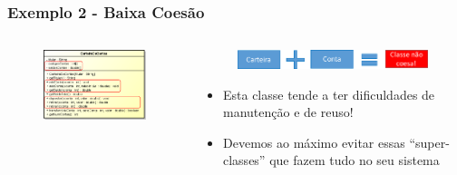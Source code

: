 \documentclass[aspectratio=169]{beamer}
\begin{document}
\begin{frame}\frametitle{Exemplo 2 - Baixa Coesão}
\begin{columns}
\begin{column}{0.5\linewidth}
\begin{figure}[h]
	\centering
	\includegraphics[height=0.45\paperheight]{imagens/carteira.png}
\end{figure}
\end{column}
\begin{column}{0.5\linewidth}
\begin{figure}[h]
	\centering
	\includegraphics[height=0.075\paperheight]{imagens/classe_nao_coesa.png}
\end{figure}
\begin{itemize}
	\item Esta classe tende a ter dificuldades de manutenção e de reuso!
	\item Devemos ao máximo evitar essas ``super-classes'' que fazem tudo no seu sistema
\end{itemize}
\end{column}
\end{columns}
\end{frame}
\end{document}
